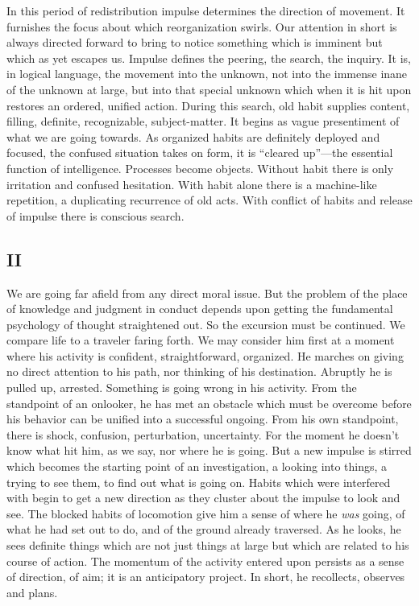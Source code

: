 \documentclass[12pt]{article}
\begin{document}
In this period of redistribution impulse determines
the direction of movement. It furnishes the focus about
which reorganization swirls. Our attention in short is
always directed forward to bring to notice something
which is imminent but which as yet escapes us. Impulse
defines the peering, the search, the inquiry. It is, in
logical language, the movement into the unknown, not
into the immense inane of the unknown at large, but into
that special unknown which when it is hit upon restores
an ordered, unified action. During this search, old
habit supplies content, filling, definite, recognizable,
subject-matter. It begins as vague presentiment of
what we are going towards. As organized habits are
definitely deployed and focused, the confused situation
takes on form, it is ``cleared up''---the essential function
of intelligence. Processes become objects. Without
habit there is only irritation and confused hesitation.
With habit alone there is a machine-like repetition,
a duplicating recurrence of old acts. With conflict
of habits and release of impulse there is conscious
search.


\subsection*{II}

We are going far afield from any direct moral issue.
But the problem of the place of knowledge and judgment
in conduct depends upon getting the fundamental
psychology of thought straightened out. So the excursion
must be continued. We compare life to a traveler
faring forth. We may consider him first at a
moment where his activity is confident, straightforward,
organized. He marches on giving no direct attention to
his path, nor thinking of his destination. Abruptly he
is pulled up, arrested. Something is going wrong in
his activity. From the standpoint of an onlooker, he
has met an obstacle which must be overcome before his
behavior can be unified into a successful ongoing. From
his own standpoint, there is shock, confusion, perturbation,
uncertainty. For the moment he doesn't know
what hit him, as we say, nor where he is going. But
a new impulse is stirred which becomes the starting
point of an investigation, a looking into things, a trying
to see them, to find out what is going on. Habits which
were interfered with begin to get a new direction as they
cluster about the impulse to look and see. The blocked
habits of locomotion give him a sense of where he \emph{was}
going, of what he had set out to do, and of the ground
already traversed. As he looks, he sees definite things
which are not just things at large but which are related
to his course of action. The momentum of the activity
entered upon persists as a sense of direction, of aim;
it is an anticipatory project. In short, he recollects,
observes and plans.
\end{document}
